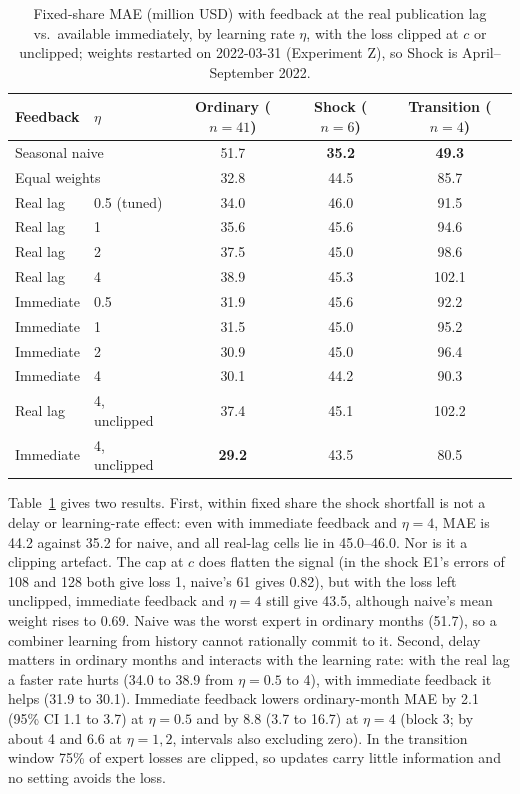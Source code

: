\documentclass[runningheads]{llncs}
\begin{document}
\begin{table}[t]
\centering
\caption{Fixed-share MAE (million USD) with feedback at the real publication lag vs.\ available
immediately, by learning rate $\eta$, with the loss clipped at $c$ or unclipped; weights restarted on
2022-03-31 (Experiment Z), so Shock is April--September 2022.}
\label{tab:zero-delay}
\small
\begin{tabular}{ll@{\hspace{9pt}}c@{\hspace{9pt}}c@{\hspace{9pt}}c}
\toprule
Feedback & $\eta$ & Ordinary ($n{=}41$) & Shock ($n{=}6$) & Transition ($n{=}4$) \\
\midrule
\multicolumn{2}{l}{Seasonal naive}  & 51.7 & \textbf{35.2} & \textbf{49.3} \\
\multicolumn{2}{l}{Equal weights}   & 32.8 & 44.5 & 85.7 \\
Real lag   & 0.5 (tuned) & 34.0 & 46.0 & 91.5 \\
Real lag   & 1           & 35.6 & 45.6 & 94.6 \\
Real lag   & 2           & 37.5 & 45.0 & 98.6 \\
Real lag   & 4           & 38.9 & 45.3 & 102.1 \\
Immediate  & 0.5         & 31.9 & 45.6 & 92.2 \\
Immediate  & 1           & 31.5 & 45.0 & 95.2 \\
Immediate  & 2           & 30.9 & 45.0 & 96.4 \\
Immediate  & 4           & 30.1 & 44.2 & 90.3 \\
Real lag   & 4, unclipped      & 37.4 & 45.1 & 102.2 \\
Immediate  & 4, unclipped      & \textbf{29.2} & 43.5 & 80.5 \\
\bottomrule
\end{tabular}
\end{table}

Table~\ref{tab:zero-delay} gives two results. First, within fixed share the shock shortfall is not
a delay or learning-rate effect: even with immediate feedback and $\eta=4$, MAE is 44.2 against 35.2
for naive, and all real-lag cells lie in 45.0--46.0. Nor is it a clipping artefact. The cap at $c$
does flatten the signal (in the shock E1's errors of 108 and 128 both give loss 1, naive's 61 gives
0.82), but with the loss left unclipped, immediate feedback and $\eta=4$ still give 43.5, although
naive's mean weight rises to 0.69. Naive was the worst expert in ordinary months (51.7), so a combiner
learning from history cannot rationally commit to it. Second, delay matters in ordinary months and
interacts with the learning rate: with the real lag a faster rate hurts (34.0 to 38.9 from $\eta=0.5$
to 4), with immediate feedback it helps (31.9 to 30.1). Immediate feedback lowers ordinary-month MAE
by 2.1 (95\% CI 1.1 to 3.7) at $\eta=0.5$ and by 8.8 (3.7 to 16.7) at $\eta=4$ (block 3; by about 4 and
6.6 at $\eta=1,2$, intervals also excluding zero). In the transition window 75\% of expert
losses are clipped, so updates carry little information and no setting avoids the loss.
\end{document}
